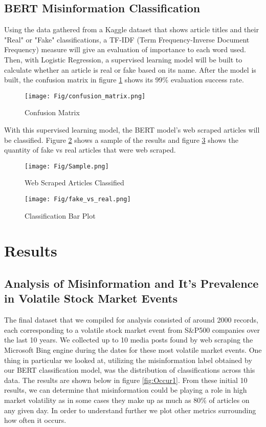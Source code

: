 \documentclass{article}
\begin{document}
\subsection{BERT Misinformation Classification}

Using the data gathered from a Kaggle dataset that shows article titles and their "Real" or "Fake" classifications, a TF-IDF (Term Frequency-Inverse Document Frequency) measure will give an evaluation of importance to each word used. Then, with Logistic Regression, a supervised learning model will be built to calculate whether an article is real or fake based on its name. After the model is built, the confusion matrix in figure \ref{fig:confusion} shows its 99\% evaluation success rate.

\begin{figure}[H]
    \centering
    \texttt{[image: Fig/confusion\_matrix.png]}
    \caption{Confusion Matrix}
    \label{fig:confusion}
\end{figure}

With this supervised learning model, the BERT model's web scraped articles will be classified. Figure \ref{fig:sample} shows a sample of the results and figure \ref{fig:fvr} shows the quantity of fake vs real articles that were web scraped.

\begin{figure}[H]
    \centering
    \texttt{[image: Fig/Sample.png]}
    \caption{Web Scraped Articles Classified}
    \label{fig:sample}
\end{figure}

\begin{figure}[H]
    \centering
    \texttt{[image: Fig/fake\_vs\_real.png]}
    \caption{Classification Bar Plot}
    \label{fig:fvr}
\end{figure}

\section{Results}

\subsection{Analysis of Misinformation and It's Prevalence in Volatile Stock Market Events}

The final dataset that we compiled for analysis consisted of around 2000 records, each corresponding to a volatile stock market event from S\&P500 companies over the last 10 years. We collected up to 10 media posts found by web scraping the Microsoft Bing engine during the dates for these most volatile market events. One thing in particular we looked at, utilizing the misinformation label obtained by our BERT classification model, was the distribution of classifications across this data. The results are shown below in figure \ref{fig:Occur1}. From these initial 10 results, we can determine that misinformation could be playing a role in high market volatility as in some cases they make up as much as 80\% of articles on any given day. In order to understand further we plot other metrics surrounding how often it occurs. 
\end{document}
